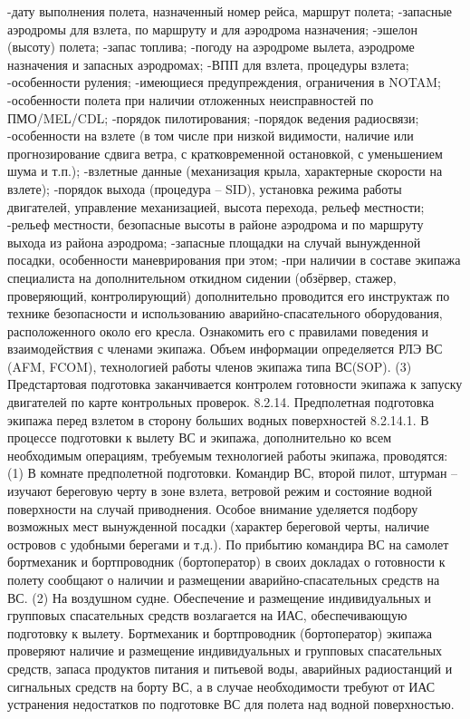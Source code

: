 -дату выполнения полета, назначенный номер рейса, маршрут полета;
-запасные аэродромы для взлета, по маршруту и для аэродрома назначения;
-эшелон (высоту) полета;
-запас топлива;
-погоду на аэродроме вылета, аэродроме назначения и запасных аэродромах; 
-ВПП для взлета, процедуры взлета;
-особенности руления; 
-имеющиеся предупреждения, ограничения в NOTAM;
-особенности полета при наличии отложенных неисправностей по ПМО/MEL/CDL;
-порядок пилотирования;
-порядок ведения радиосвязи;
-особенности на взлете (в том числе при низкой видимости, наличие или прогнозирование сдвига ветра, с кратковременной остановкой, с уменьшением шума и т.п.);
-взлетные данные (механизация крыла, характерные скорости на взлете); 
-порядок выхода (процедура – SID), установка режима работы двигателей, управление механизацией, высота перехода, рельеф местности; 
-рельеф местности, безопасные высоты в районе аэродрома и по маршруту выхода из района аэродрома;
-запасные площадки на случай вынужденной посадки, особенности маневрирования при этом;
-при наличии в составе экипажа специалиста на дополнительном откидном сидении (обзёрвер, стажер, проверяющий, контролирующий) дополнительно проводится его инструктаж по технике безопасности и использованию аварийно-спасательного оборудования, расположенного около его кресла. Ознакомить его с правилами поведения и взаимодействия с членами экипажа.
Объем информации определяется РЛЭ ВС (AFM, FCOM), технологией работы членов экипажа типа ВС(SOP).
(3) Предстартовая подготовка заканчивается контролем готовности экипажа к запуску двигателей по карте контрольных проверок.
            8.2.14. Предполетная подготовка экипажа перед взлетом в сторону больших водных                                          поверхностей
8.2.14.1. В процессе подготовки к вылету ВС и экипажа, дополнительно ко всем необходимым операциям, требуемым технологией работы экипажа, проводятся:
(1) В комнате предполетной подготовки. Командир ВС, второй пилот, штурман – изучают береговую черту в зоне взлета, ветровой режим и состояние водной поверхности на случай приводнения. Особое внимание уделяется подбору возможных мест вынужденной посадки (характер береговой черты, наличие островов с удобными берегами и т.д.).
По прибытию командира ВС на самолет бортмеханик и бортпроводник (бортоператор) в своих докладах о готовности к полету сообщают о наличии и размещении аварийно-спасательных средств на ВС.
(2) На воздушном судне. Обеспечение и размещение индивидуальных и групповых спасательных средств возлагается на ИАС, обеспечивающую подготовку к вылету. Бортмеханик и бортпроводник (бортоператор) экипажа проверяют наличие и размещение индивидуальных и групповых спасательных средств, запаса продуктов питания и питьевой воды, аварийных радиостанций и сигнальных средств на борту ВС, а в случае необходимости требуют от ИАС устранения недостатков по подготовке ВС для полета над водной поверхностью.
